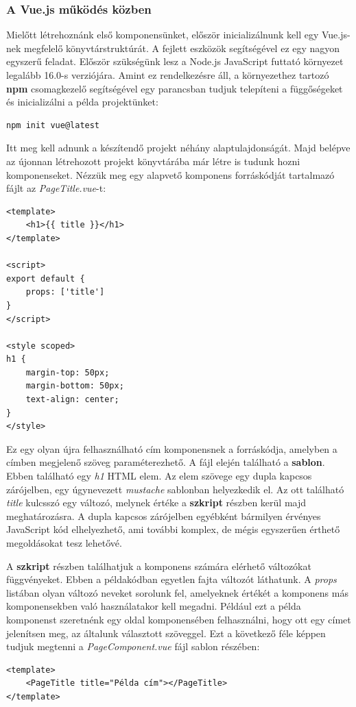\documentclass[12pt]{article}
\begin{document}
\subsubsection{A Vue.js működés közben}

Mielőtt létrehoznánk első komponensünket, először inicializálnunk kell egy Vue.js-nek megfelelő könyvtárstruktúrát. A fejlett eszközök segítségével ez egy nagyon egyszerű feladat. Először szükségünk lesz a Node.js JavaScript futtató környezet legalább 16.0-s verziójára. Amint ez rendelkezésre áll, a környezethez tartozó \textbf{npm} csomagkezelő segítségével egy parancsban tudjuk telepíteni a függőségeket és inicializálni a példa projektünket:
\begin{verbatim}
npm init vue@latest
\end{verbatim}

Itt meg kell adnunk a készítendő projekt néhány alaptulajdonságát. Majd belépve az újonnan létrehozott projekt könyvtárába már létre is tudunk hozni komponenseket.
Nézzük meg egy alapvető komponens forráskódját tartalmazó fájlt az \textit{PageTitle.vue}-t:
\begin{verbatim}
<template>
    <h1>{{ title }}</h1>
</template>

<script>
export default {
    props: ['title']
}
</script>

<style scoped>
h1 {
    margin-top: 50px;
    margin-bottom: 50px;
    text-align: center;
}
</style>
\end{verbatim}

Ez egy olyan újra felhasználható cím komponensnek a forráskódja, amelyben a címben megjelenő szöveg paraméterezhető. A fájl elején található a \textbf{sablon}. Ebben található egy \textit{h1} HTML elem. Az elem szövege egy dupla kapcsos zárójelben, egy úgynevezett \textit{mustache} sablonban helyezkedik el. Az ott található \textit{title} kulcsszó egy változó, melynek értéke a \textbf{szkript} részben kerül majd meghatározásra. A dupla kapcsos zárójelben egyébként bármilyen érvényes JavaScript kód elhelyezhető, ami további komplex, de mégis egyszerűen érthető megoldásokat tesz lehetővé.

A \textbf{szkript} részben találhatjuk a komponens számára elérhető változókat függvényeket. Ebben a példakódban egyetlen fajta változót láthatunk. A \textit{props} listában olyan változó neveket sorolunk fel, amelyeknek értékét a komponens más komponensekben való használatakor kell megadni. Például ezt a példa komponenst szeretnénk egy oldal komponensében felhasználni, hogy ott egy címet jelenítsen meg, az általunk választott szöveggel. Ezt a következő féle képpen tudjuk megtenni a \textit{PageComponent.vue} fájl sablon részében:
\begin{verbatim}
<template>
    <PageTitle title="Példa cím"></PageTitle>
</template>
\end{verbatim}
\end{document}
